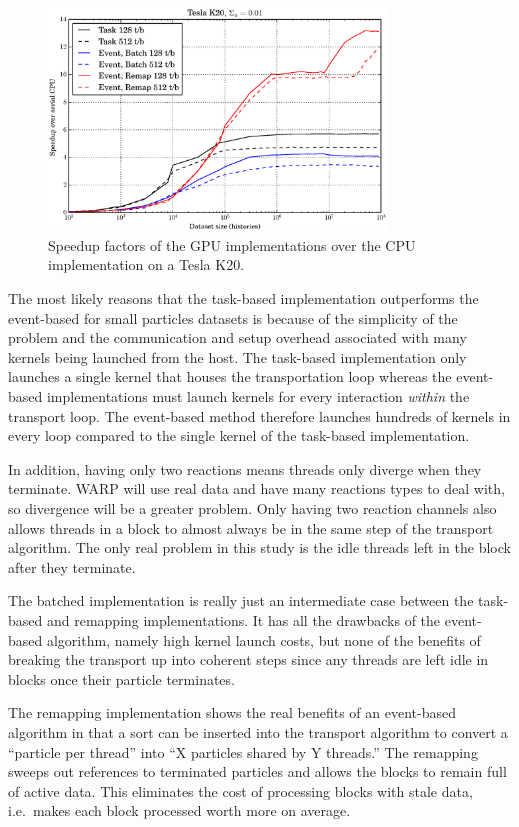 \begin{figure}[h!] 
  \centering
    \includegraphics[width=0.8\textwidth]{graphics/prelim_speedup_001_k20.eps}
     \caption{Speedup factors of the GPU implementations over the CPU implementation on a Tesla K20. \label{prelim_speedup_01} }
\end{figure}

The most likely reasons that the task-based implementation outperforms the event-based for small particles datasets is because of the simplicity of the problem and the communication and setup overhead associated with many kernels being launched from the host.  The task-based implementation only launches a single kernel that houses the transportation loop whereas the event-based implementations must launch kernels for every interaction \emph{within} the transport loop.  The event-based method therefore launches hundreds of kernels in every loop compared to the single kernel of the task-based implementation.  

In addition, having only two reactions means threads only diverge when they terminate.  WARP will use real data and have many reactions types to deal with, so divergence will be a greater problem.  Only having two reaction channels also allows threads in a block to almost always be in the same step of the transport algorithm.  The only real problem in this study is the idle threads left in the block after they terminate.  

The batched implementation is really just an intermediate case between the task-based and remapping implementations.  It has all the drawbacks of the event-based algorithm, namely high kernel launch costs, but none of the benefits of breaking the transport up into coherent steps since any threads are left idle in blocks once their particle terminates.  

The remapping implementation shows the real benefits of an event-based algorithm in that a sort can be inserted into the transport algorithm to convert a ``particle per thread'' into ``X particles shared by Y threads.''  The remapping sweeps out references to terminated particles and allows the blocks to remain full of active data.  This eliminates the cost of processing blocks with stale data, i.e.\ makes each block processed worth more on average.   

